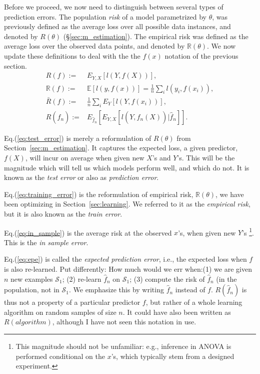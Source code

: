 \documentclass[12pt,a4paper]{article}
\theoremstyle{plain}
\theoremstyle{definition}
\newcommand{\expectg}[2]{E_{#1}\left[ #2 \right]}
\newcommand{\expectn}[1]{\mathbb{E}\left[#1\right]}
\newcommand{\loss}{l}
\newcommand{\risk}{R}
\newcommand{\riskn}{\mathbb{R}}
\newcommand{\hyp}{f}
\newcommand{\sample}{\mathcal{S}}
\newcommand{\test}{\risk(\hyp)}
\newcommand{\train}{\riskn(\hyp)}
\newcommand{\insample}{\bar{\risk}(\hyp)}
\newcommand{\EPE}{\risk(\hat{\hyp}_n)}
\begin{document}
Before we proceed, we now need to distinguish between several types of prediction errors.
The population \emph{risk} of a model parametrized by $\theta$, was previously defined as the average loss over all possible data instances, and denoted by $\risk(\theta)$ (\S \ref{sec:m_estimation}).
The empirical risk was defined as the average loss over the observed data points, and denoted by $\riskn(\theta)$.
We now update these definitions to deal with the the $\hyp(x)$ notation of the previous section.
\begin{align}
	\test :=& \expectg{Y,X}{\loss(Y,\hyp(X))}, \label{eq:test_error} \\
	\train :=& \expectn{\loss(y,\hyp(x))} = \frac{1}{n} \sum_i \loss(y_i,\hyp(x_i)),  \label{eq:training_error} \\
	\insample :=& \frac{1}{n} \sum_i \expectg{Y}{\loss(Y,\hyp(x_i))}, \label{eq:in_sample} \\
	\EPE :=& \expectg{\hat{\hyp}_n}{
		\expectg{Y,X}{\loss(Y,\hat{\hyp}_n(X))|\hat{\hyp}_n}
	}.\label{eq:epe}
\end{align}

Eq.(\ref{eq:test_error}) is merely a reformulation of $\risk(\theta)$ from Section~\ref{sec:m_estimation}.
It captures the expected loss, a given predictor, $\hyp(X)$, will incur on average when given new $X$'s and $Y$'s.
This will be the magnitude which will tell us which models perform well, and which do not.
It is known as the \emph{test error} or also as \emph{prediction error}.

Eq.(\ref{eq:training_error}) is the reformulation of empirical risk, $\riskn(\theta)$, we have been optimizing in Section~\ref{sec:learning}.
We referred to it as the \emph{empirical risk}, but it is also known as the \emph{train error}.

Eq.(\ref{eq:in_sample}) is the average risk at the observed $x$'s, when given new $Y$'s \footnote{This magnitude should not be unfamiliar: e.g., inference in ANOVA is performed conditional on the $x$'s, which typically stem from a designed experiment.}.
This is the \emph{in sample error}.

Eq.(\ref{eq:epe}) is called the \emph{expected prediction error}, i.e., the expected loss when $\hyp$ is also re-learned. 
Put differently: How much would we err when:(1) we are given $n$ new examples $\sample_1$; (2) re-learn $\hat{\hyp}_n$ on $\sample_1$; (3) compute the risk of $\hat{\hyp}_n$ (in the population, not in $\sample_1$.
We emphasize this by writing $\hat{\hyp}_n$ instead of $\hyp$.
$\EPE$ is thus not a property of a particular predictor $\hyp$, but rather of a whole learning algorithm on random samples of size $n$.
It could have also been written as $\risk(algorithm)$, although I have not seen this notation in use.
\end{document}
